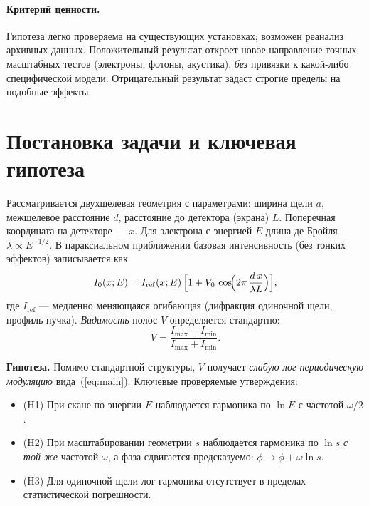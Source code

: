 \documentclass[a4paper,12pt]{article}
\begin{document}
\paragraph{Критерий ценности.}
Гипотеза легко проверяема на существующих установках; возможен реанализ архивных данных.
Положительный результат откроет новое направление точных масштабных тестов (электроны, фотоны, акустика),
\emph{без} привязки к какой-либо специфической модели. Отрицательный результат задаст строгие пределы на подобные эффекты.

\section{Постановка задачи и ключевая гипотеза}
Рассматривается двухщелевая геометрия с параметрами: ширина щели $a$, межщелевое расстояние $d$,
расстояние до детектора (экрана) $L$. Поперечная координата на детекторе --- $x$.
Для электрона с энергией $E$ длина де Бройля $\lambda\propto E^{-1/2}$.
В параксиальном приближении базовая интенсивность (без тонких эффектов) записывается как
\begin{equation}
I_0(x;E)=I_{\mathrm{ref}}(x;E)\,\Bigl[1+V_0\,\cos\!\Bigl(2\pi\,\frac{d\,x}{\lambda L}\Bigr)\Bigr],
\end{equation}
где $I_{\mathrm{ref}}$ --- медленно меняющаяся огибающая (дифракция одиночной щели, профиль пучка).
\emph{Видимость} полос $V$ определяется стандартно:
\begin{equation}
V=\frac{I_{\max}-I_{\min}}{I_{\max}+I_{\min}}.
\end{equation}

\noindent
\textbf{Гипотеза.} Помимо стандартной структуры, $V$ получает \emph{слабую лог-периодическую модуляцию}
вида~(\ref{eq:main}). Ключевые проверяемые утверждения:
\begin{itemize}
  \item (H1) При скане по энергии $E$ наблюдается гармоника по $\ln E$ с частотой $\omega/2$.
  \item (H2) При масштабировании геометрии $s$ наблюдается гармоника по $\ln s$ \emph{с той же} частотой $\omega$,
  а фаза сдвигается предсказуемо: $\phi\to\phi+\omega\ln s$.
  \item (H3) Для одиночной щели лог-гармоника отсутствует в пределах статистической погрешности.
\end{itemize}
\end{document}
